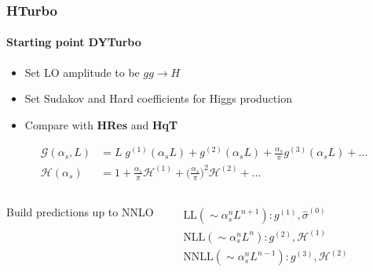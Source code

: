 \documentclass[aspectratio=43]{beamer}
\begin{document}
\begin{frame}

	\frametitle{HTurbo}
	\framesubtitle{Starting point DYTurbo}
	
	\begin{itemize}
		\item Set LO amplitude to be $gg \rightarrow H$
		\item Set Sudakov and Hard coefficients for Higgs production
		\item Compare with \textbf{HRes} and \textbf{HqT}
	\end{itemize}
	
	\begin{align}
		\mathcal{G}(\alpha_{s}, L) &= L\;g^{(1)}(\alpha_{s}L) + g^{(2)}(\alpha_{s}L) + \frac{\alpha_{s}}{\pi}g^{(3)}(\alpha_{s}L) + ... \nonumber \\
		\mathcal{H}(\alpha_{s}) &= 1 + \frac{\alpha_{s}}{\pi}\mathcal{H}^{(1)} + \Big(\frac{\alpha_{s}}{\pi}\Big)^{2}\mathcal{H}^{(2)} + ...  \nonumber
	\end{align}
	
	\begin{columns}
		

		Build predictions up to NNLO
	
		
		\begin{align}
			&\textrm{LL} (\sim \alpha_{s}^{n}L^{n+1}): g^{(1)}, \hat{\sigma}^{(0)} \nonumber \\
			&\textrm{NLL} (\sim \alpha_{s}^{n}L^{n}): g^{(2)}, \mathcal{H}^{(1)} \nonumber \\
			&\textrm{NNLL} (\sim \alpha_{s}^{n}L^{n-1}): g^{(3)}, \mathcal{H}^{(2)} \nonumber
		\end{align}
		
	\end{columns}

\end{frame}
\end{document}
